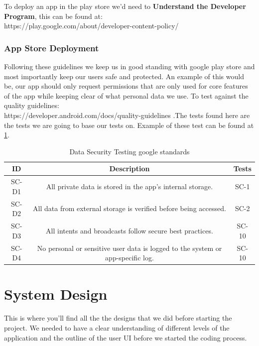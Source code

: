 \documentclass[a4paper,12pt]{report}
\begin{document}
To deploy an app in the play store we'd need to
\textbf{Understand the Developer Program}, this can be found at:\\ https://play.google.com/about/developer-content-policy/
\subsection{App Store Deployment}
Following these guidelines we keep us in good standing with google play store and most importantly keep our users safe and protected. An example of this would be, our app should only request permissions that are only used for core features of the app while keeping clear of what personal data we use. To test against the quality guidelines:\\ https://developer.android.com/docs/quality-guidelines .The tests found here are the tests we are going to base our tests on. Example of these test can be found at \ref{tab:SecurityTest}.


\begin{table}[h]
\begin{tabular}{||c c c||} 
 \hline
 \textbf{ID} & \textbf{Description} & \textbf{Tests} \\ [0.5ex] 
 \hline\hline
 SC-D1 & All private data is stored in the app's internal storage. & SC-1 \\ 
 \hline
 SC-D2 & All data from external storage is verified before being accessed. & SC-2 \\  
 \hline
 SC-D3 & All intents and broadcasts follow secure best practices. & SC-10 \\
 \hline
 SC-D4 & No personal or sensitive user data is logged to the system or app-specific log. & SC-10 \\
 \hline
\end{tabular}
\caption{Data Security Testing google standards}
\label{tab:SecurityTest}
\end{table}


\chapter{System Design}
This is where you’ll find all the the designs that we did before starting the project. We needed to have a clear understanding of different levels of the application and the outline of the user UI before we started the coding process.
\end{document}
